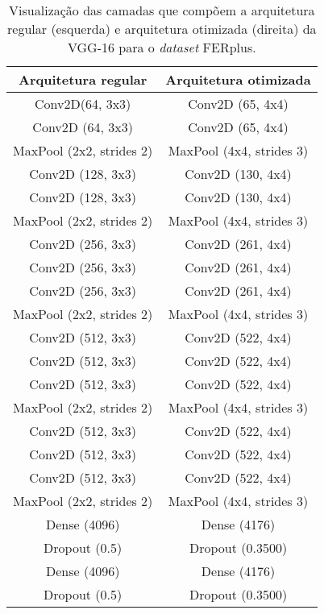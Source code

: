 \documentclass[
12pt,       %
openright,      %
oneside,      %
a4paper,      %
english,      %
french,       %
spanish,      %
brazil        %
]{abntex2}
\begin{document}
\begin{table}[H]
\centering
\caption{Visualização das camadas que compõem a arquitetura regular (esquerda) e arquitetura otimizada (direita) da VGG-16 para o \textit{dataset} FERplus.}
\label{tab:comparacao-vgg16-ferplus}
\begin{tabular}{@{}cc@{}}
\toprule
\textbf{Arquitetura regular} & \textbf{Arquitetura otimizada} \\ \midrule
Conv2D(64, 3x3)              & Conv2D (65, 4x4)                \\
Conv2D (64, 3x3)              & Conv2D (65, 4x4)                \\
MaxPool (2x2, strides 2)     & MaxPool (4x4, strides 3)       \\
Conv2D (128, 3x3)             & Conv2D (130, 4x4)               \\
Conv2D (128, 3x3)             & Conv2D (130, 4x4)               \\
MaxPool (2x2, strides 2)     & MaxPool (4x4, strides 3)       \\
Conv2D (256, 3x3)             & Conv2D (261, 4x4)               \\
Conv2D (256, 3x3)             & Conv2D (261, 4x4)               \\
Conv2D (256, 3x3)             & Conv2D (261, 4x4)               \\
MaxPool (2x2, strides 2)     & MaxPool (4x4, strides 3)       \\
Conv2D (512, 3x3)             & Conv2D (522, 4x4)               \\
Conv2D (512, 3x3)             & Conv2D (522, 4x4)               \\
Conv2D (512, 3x3)             & Conv2D (522, 4x4)               \\
MaxPool (2x2, strides 2)     & MaxPool (4x4, strides 3)       \\
Conv2D (512, 3x3)             & Conv2D (522, 4x4)               \\
Conv2D (512, 3x3)             & Conv2D (522, 4x4)               \\
Conv2D (512, 3x3)             & Conv2D (522, 4x4)               \\
MaxPool (2x2, strides 2)     & MaxPool (4x4, strides 3)       \\
Dense (4096)                 & Dense (4176)                   \\
Dropout (0.5)                & Dropout (0.3500)               \\
Dense (4096)                 & Dense (4176)                   \\
Dropout (0.5)                & Dropout (0.3500)               \\ \bottomrule
\end{tabular}
\end{table}
\end{document}

